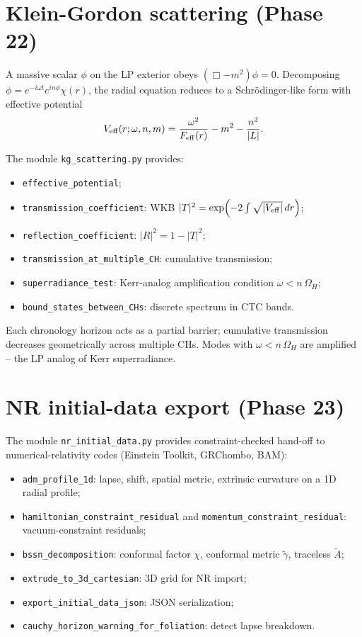 \documentclass[11pt,a4paper]{article}
\begin{document}
\section{Klein-Gordon scattering (Phase 22)}

A massive scalar $\phi$ on the LP exterior obeys
$(\Box - m^2)\phi = 0$. Decomposing $\phi = e^{-i\omega t}e^{in\phi}\chi(r)$,
the radial equation reduces to a Schrödinger-like form with effective
potential
\[
V_{\rm eff}(r;\omega,n,m) = \frac{\omega^2}{F_{\rm eff}(r)} - m^2 - \frac{n^2}{|L|}.
\]

The module \texttt{kg\_scattering.py} provides:
\begin{itemize}
\item \texttt{effective\_potential};
\item \texttt{transmission\_coefficient}: WKB $|T|^2 = \exp\!\left(-2\int\sqrt{|V_{\rm eff}|}\,dr\right)$;
\item \texttt{reflection\_coefficient}: $|R|^2 = 1 - |T|^2$;
\item \texttt{transmission\_at\_multiple\_CH}: cumulative transmission;
\item \texttt{superradiance\_test}: Kerr-analog amplification condition $\omega < n\,\Omega_H$;
\item \texttt{bound\_states\_between\_CHs}: discrete spectrum in CTC bands.
\end{itemize}

Each chronology horizon acts as a partial barrier; cumulative
transmission decreases geometrically across multiple CHs. Modes with
$\omega < n\,\Omega_H$ are amplified -- the LP analog of Kerr
superradiance.

\section{NR initial-data export (Phase 23)}

The module \texttt{nr\_initial\_data.py} provides constraint-checked
hand-off to numerical-relativity codes (Einstein Toolkit, GRChombo,
BAM):
\begin{itemize}
\item \texttt{adm\_profile\_1d}: lapse, shift, spatial metric, extrinsic curvature on a 1D radial profile;
\item \texttt{hamiltonian\_constraint\_residual} and
  \texttt{momentum\_constraint\_residual}: vacuum-constraint residuals;
\item \texttt{bssn\_decomposition}: conformal factor $\chi$, conformal
  metric $\tilde\gamma$, traceless $\tilde A$;
\item \texttt{extrude\_to\_3d\_cartesian}: 3D grid for NR import;
\item \texttt{export\_initial\_data\_json}: JSON serialization;
\item \texttt{cauchy\_horizon\_warning\_for\_foliation}: detect lapse breakdown.
\end{itemize}
\end{document}
